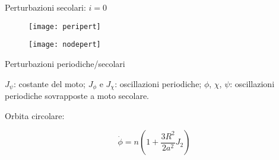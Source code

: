 \begin{frame}{Perturbazioni secolari: $i=0$}

\begin{figure}[!ht]\texttt{[image: peripert]}\end{figure}

\begin{figure}[!ht]\texttt{[image: nodepert]}\end{figure}

\end{frame}


\begin{wordonframe}{Perturbazioni periodiche/secolari}

$J_{\psi}$: costante del moto; $J_{\phi}$ e $J_{\chi}$: oscillazioni periodiche; $\phi$, $\chi$, $\psi$: oscillazioni periodiche sovrapposte a moto secolare. 

Orbita circolare:

\begin{equation*}
\dot{\phi}=n(1+\frac{3R^2}{2a^2}J_2)
\end{equation*}


\end{wordonframe}
